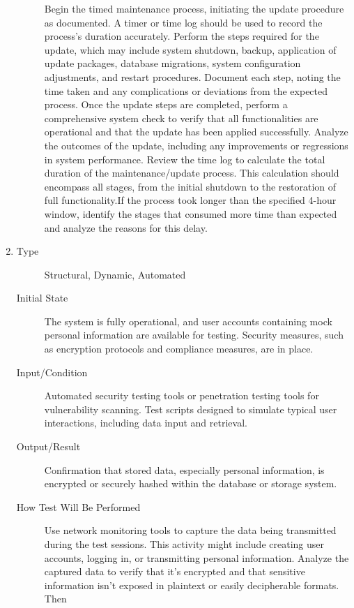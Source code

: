 \documentclass[12pt, titlepage]{article}
\begin{document}
\begin{enumerate}[NFR-T1]
\begin{description}
    Begin the timed maintenance process, initiating the update procedure as
    documented. A timer or time log should be used to record the process's
    duration accurately. Perform the steps required for the update, which may
    include system shutdown, backup, application of update packages, database
    migrations, system configuration adjustments, and restart procedures.
    Document each step, noting the time taken and any complications or
    deviations from the expected process. Once the update steps are completed,
    perform a comprehensive system check to verify that all functionalities are
    operational and that the update has been applied successfully. Analyze the
    outcomes of the update, including any improvements or regressions in system
    performance. Review the time log to calculate the total duration of the
    maintenance/update process. This calculation should encompass all stages,
    from the initial shutdown to the restoration of full functionality.If the
    process took longer than the specified 4-hour window, identify the stages
    that consumed more time than expected and analyze the reasons for this
    delay.
  \end{description}
\item \label{NFRT21}
  \begin{description}
  \item[Type] Structural, Dynamic, Automated
  \item[Initial State] The system is fully operational, and user accounts
    containing mock personal information are available for testing. Security
    measures, such as encryption protocols and compliance measures, are in
    place.
  \item[Input/Condition] Automated security testing tools or penetration testing
    tools for vulnerability scanning. Test scripts designed to simulate typical
    user interactions, including data input and retrieval.
  \item[Output/Result] Confirmation that stored data, especially personal
    information, is encrypted or securely hashed within the database or storage
    system.
  \item[How Test Will Be Performed] Use network monitoring tools to capture the
    data being transmitted during the test sessions. This activity might include
    creating user accounts, logging in, or transmitting personal information.
    Analyze the captured data to verify that it's encrypted and that sensitive
    information isn't exposed in plaintext or easily decipherable formats. Then

\end{description}
\end{enumerate}
\end{document}
